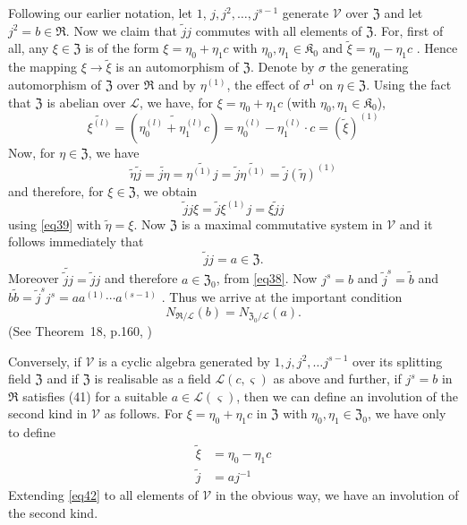 Following our earlier notation, let $1$, $j, j^2,\ldots, j^{s-1}$
generate $\mathscr{V}$ over $\mathfrak{Z}$ and let $j^2 = b \in
\mathfrak{R}$. Now we claim that $\widetilde{j} j$ commutes with all
elements of $\mathfrak{Z}$. For, first of all, any $\xi \in
\mathfrak{Z}$ is of the form $\xi = \eta_0 + \eta_1 c$ with $\eta_0,
\eta_1 \in \mathfrak{K}_0$ and $\widetilde{\xi} = \eta_0 - \eta_1 c $ . Hence
the mapping $\xi \rightarrow \widetilde{\xi}$ is an automorphism of
$\mathfrak{Z}$. Denote by $\sigma$ the generating automorphism of
$\mathfrak{Z}$ over $\mathfrak{R}$ and by $\eta^{(1)}$, the effect of
$\sigma^1$ on $\eta \in \mathfrak{Z}$. Using the fact that
$\mathfrak{Z}$ is abelian over $\mathscr{L}$, we have, for $\xi =
\eta_0 + \eta_1 c$ (with $\eta_0, \eta_1 \in \mathfrak{K}_0$),
\begin{equation*}
\widetilde{\xi^{(l)}} = (\widetilde{\eta^{(l)}_0 + \eta^{(l)}_1 c}) =
\eta^{(l)}_0 - \eta^{(l)}_1 \cdot c = (\widetilde{\xi})^{(1)} \tag{38}\label{eq38}
\end{equation*}
Now, for $\eta \in \mathfrak{Z}$, we have
\begin{equation*}
\tilde{\eta} \tilde{j} = \widetilde{j\eta} = \widetilde{\eta^{(1)}j} =
\tilde{j} \widetilde{\eta^{(1)}} = \tilde{j} (\tilde{\eta})^{(1)}
\tag{39}\label{eq39} 
\end{equation*}\pageoriginale
and therefore, for $\xi \in \mathfrak{Z}$, we obtain
$$
\tilde{j}j \xi = \tilde{j} \xi^{(1)} j = \xi \tilde{j}j
$$
using \eqref{eq39} with $\tilde{\eta}= \xi$. Now $\mathfrak{Z}$ is a maximal
commutative system in $\mathscr{V}$ and it follows immediately that
\begin{equation*}
\tilde{j} j = a \in \mathfrak{Z}. \tag{40}\label{eq40}
\end{equation*}
Moreover $\widetilde{\tilde{j}j} = \tilde{j}j$ and therefore $a\in
\mathfrak{Z}_0$, from \eqref{eq38}. Now $j^s=b$ and $\tilde{j}^s = \tilde{b}$
and $b \tilde{b} = \tilde{j}^s j^s = a a^{(1)} \cdots a^{(s-1)}$
. Thus we arrive at the important condition
\begin{equation*}
N_{\mathfrak{R}/\mathscr{L}}(b) = N_{\mathfrak{Z}_0/\mathscr{L}}
(a). \tag{41}\label{eq41} 
\end{equation*}
(See Theorem~18, p.160, \cite{1})

Conversely, if $\mathscr{V}$ is a cyclic algebra generated by
$1,j,j^2,\ldots j^{s-1}$ over its splitting field $\mathfrak{Z}$ and
if $\mathfrak{Z}$ is realisable as a field $\mathscr{L}(c,\varsigma)$
as above and further, if $j^s=b$ in $\mathfrak{R}$ satisfies (41) for
a suitable $a\in \mathscr{L}(\varsigma)$, then we can define an
involution of the second kind in $\mathscr{V}$ as follows. For $\xi =
\eta_0 + \eta_1 c$ in $\mathfrak{Z}$ with $\eta_0, \eta_1 \in
\mathfrak{Z}_0$, we have only to define
\begin{align*}
\widetilde{\xi} & = \eta_0 - \eta_1 c \\
\widetilde{j} & = a j^{-1} \tag{42}\label{eq42}
\end{align*}
Extending \eqref{eq42} to all elements of $\mathscr{V}$ in the obvious way, we
have an involution of the second kind.

